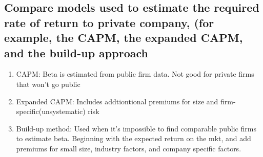 \documentclass{article}
\newcommand{\be}{\begin{enumerate}}
\newcommand{\ee}{\end{enumerate}}
\begin{document}
\subsection{Compare models used to estimate the required rate of return to private company,
(for example, the CAPM, the expanded CAPM, and the build-up approach}
\be
    \item CAPM: Beta is estimated from public firm data. Not good for private firms that won't go public
    \item Expanded CAPM: Includes addtiontional premiums for size and firm-specific(unsystematic) risk
    \item Build-up method: Used when it's impossible to find comparable public firms to estimate beta.
        Beginning with the expected return on the mkt, and add premiums for small size, industry
        factors, and company specific factors.
\ee
\end{document}
